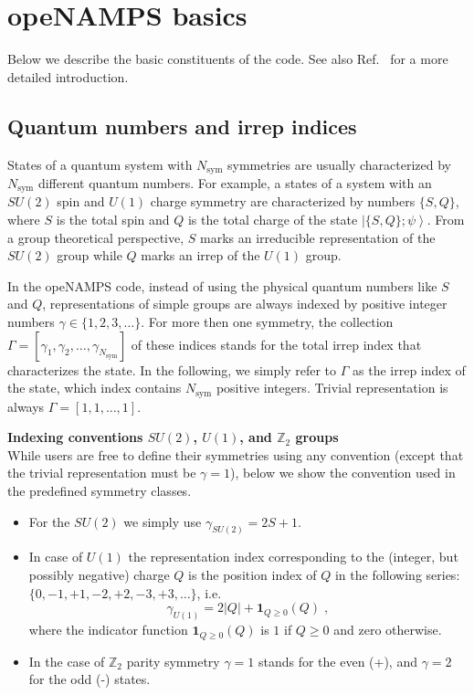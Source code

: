 \documentclass[aps,prb,twocolumn,showpacs,preprintnumbers,amsmath,amssymb, superscriptaddressm, nofootinbib]{revtex4-2}   %
\newcommand{\sym}{\mathrm{sym}}
\begin{document}
\section{opeNAMPS basics}
Below we describe the basic constituents of the code. See also Ref.~ for a more detailed introduction. 

\subsection{Quantum numbers and irrep indices}
States of a quantum system with $N_\sym$ symmetries are usually characterized by $N_\sym$ different quantum numbers. For example, a states of a system with an $SU(2)$ spin and $U(1)$ charge symmetry are characterized by numbers $\lbrace S, Q \rbrace$, where $S$ is the total spin and $Q$ is the total charge of the state $\left| \lbrace S,Q \rbrace; \psi \right\rangle$. From a group theoretical perspective, $S$ marks an irreducible representation of the $SU(2)$ group while $Q$ marks an irrep of the $U(1)$ group. 

In the opeNAMPS code, instead of using the physical quantum numbers like $S$ and $Q$, representations of simple groups are always indexed by positive integer numbers $\gamma \in \lbrace 1,2,3,\dots \rbrace$. For more then one symmetry, the collection $\Gamma = \left[ \gamma_1, \gamma_2, \dots, \gamma_{N_\sym} \right]$ of these indices stands for the total irrep index that characterizes the state. In the following, we simply refer to $\Gamma$ as the irrep index of the state, which index contains $N_\sym$ positive integers. Trivial representation is always $\Gamma = [1,1,\dots,1]$.

\smallskip
\textbf{Indexing conventions $SU(2)$, $U(1)$, and $\mathbb{Z}_2$ groups} \\
While users are free to define their symmetries using any convention (except that the trivial representation must be $\gamma = 1$), below we show the convention used in the predefined symmetry classes.
\begin{itemize}
\item For the $SU(2)$ we simply use $\gamma_{SU(2)} = 2S + 1$.
\item In case of $U(1)$ the representation index corresponding to the (integer, but possibly negative) charge $Q$ is the position index of $Q$ in the following series: $\lbrace 0, -1, +1, -2, +2, -3, +3, \dots \rbrace$, i.e.
\begin{equation}
   \gamma_{U(1)} = 2 |Q| + \mathbf{1}_{Q \ge 0}(Q) \;,  
\end{equation}
where the indicator function $\mathbf{1}_{Q \ge 0}(Q)$ is $1$ if $Q \ge 0$ and zero otherwise.
\item In the case of $\mathbb{Z}_2$ parity symmetry $\gamma = 1$ stands for the even (+), and $\gamma=2$ for the odd (-) states.
\end{itemize}
\end{document}

